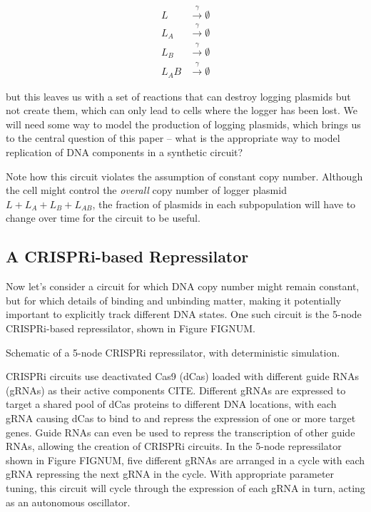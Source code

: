 \documentclass[preprint,12pt]{elsarticle}
\begin{document}
\begin{align}
	L &\xrightarrow{\gamma} \emptyset \\
	L_A &\xrightarrow{\gamma} \emptyset \\
	L_B &\xrightarrow{\gamma} \emptyset \\
	L_AB &\xrightarrow{\gamma} \emptyset			
\end{align}

but this leaves us with a set of reactions that can destroy logging plasmids but not create them, which can only lead to cells where the logger has been lost. We will need some way to model the production of logging plasmids, which brings us to the central question of this paper -- what is the appropriate way to model replication of DNA components in a synthetic circuit? 

Note how this circuit violates the assumption of constant copy number. Although the cell might control the \emph{overall} copy number of logger plasmid $L + L_A + L_B + L_{AB}$, the fraction of plasmids in each subpopulation will have to change over time for the circuit to be useful. 

\subsection{A CRISPRi-based Repressilator}\label{ss:crispriex}

Now let's consider a circuit for which DNA copy number might remain constant, but for which details of binding and unbinding matter, making it potentially important to explicitly track different DNA states. One such circuit is the 5-node CRISPRi-based repressilator, shown in Figure FIGNUM.

\vspace{.5in}
Schematic of a 5-node CRISPRi repressilator, with deterministic simulation.
\vspace{.5in}

CRISPRi circuits use deactivated Cas9 (dCas) loaded with different guide RNAs (gRNAs) as their active components {CITE}. Different gRNAs are expressed to target a shared pool of dCas proteins to different DNA locations, with each gRNA causing dCas to bind to and repress the expression of one or more target genes. Guide RNAs can even be used to repress the transcription of other guide RNAs, allowing the creation of CRISPRi circuits. In the 5-node repressilator shown in Figure {FIGNUM}, five different gRNAs are arranged in a cycle with each gRNA repressing the next gRNA in the cycle. With appropriate parameter tuning, this circuit will cycle through the expression of each gRNA in turn, acting as an autonomous oscillator. 
\end{document}
